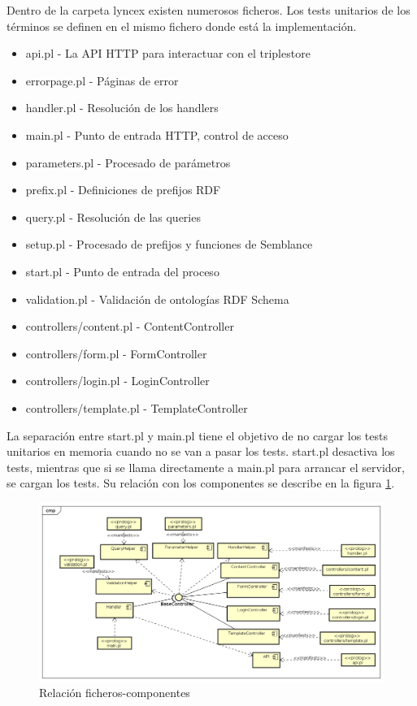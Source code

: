 \documentclass[openright,twoside,12pt]{book}
\begin{document}
Dentro de la carpeta lyncex existen numerosos ficheros. Los tests unitarios de los términos se definen en el mismo fichero donde está la implementación.

\begin{itemize}
    \item api.pl - La API HTTP para interactuar con el triplestore
    \item errorpage.pl - Páginas de error
    \item handler.pl - Resolución de los handlers
    \item main.pl - Punto de entrada HTTP, control de acceso
    \item parameters.pl - Procesado de parámetros
    \item prefix.pl - Definiciones de prefijos RDF
    \item query.pl - Resolución de las queries
    \item setup.pl - Procesado de prefijos y funciones de Semblance
    \item start.pl - Punto de entrada del proceso
    \item validation.pl - Validación de ontologías RDF Schema
    \item controllers/content.pl - ContentController
    \item controllers/form.pl - FormController
    \item controllers/login.pl - LoginController
    \item controllers/template.pl - TemplateController
\end{itemize}

La separación entre start.pl y main.pl tiene el objetivo de no cargar los tests unitarios en memoria cuando no se van a pasar los tests. start.pl desactiva los tests, mientras que si se llama directamente a main.pl para arrancar el servidor, se cargan los tests. Su relación con los componentes se describe en la figura \ref{fig:manifest}.

\begin{figure}
    \centering
    \includegraphics[width=\textwidth]{manifests.png}
    \caption{Relación ficheros-componentes}
    \label{fig:manifest}
\end{figure}
\end{document}
